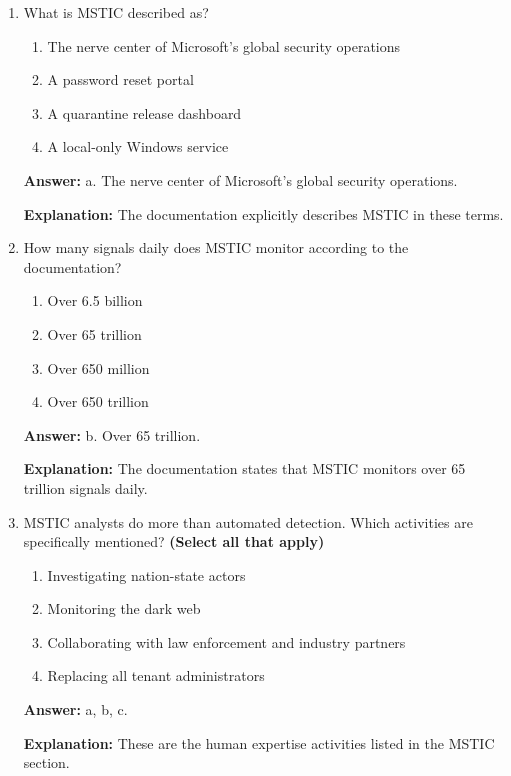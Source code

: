 \documentclass[10pt]{article}
\begin{document}
\begin{enumerate}[leftmargin=*]
\textbf{Explanation:} The documentation specifically identifies IT administrators and security professionals as the audience for these tools.

\item What is MSTIC described as?
\begin{enumerate}[label=\alph*., leftmargin=1.5em]
\item The nerve center of Microsoft’s global security operations
\item A password reset portal
\item A quarantine release dashboard
\item A local-only Windows service
\end{enumerate}
\textbf{Answer:} a. The nerve center of Microsoft’s global security operations.

\textbf{Explanation:} The documentation explicitly describes MSTIC in these terms.

\item How many signals daily does MSTIC monitor according to the documentation?
\begin{enumerate}[label=\alph*., leftmargin=1.5em]
\item Over 6.5 billion
\item Over 65 trillion
\item Over 650 million
\item Over 650 trillion
\end{enumerate}
\textbf{Answer:} b. Over 65 trillion.

\textbf{Explanation:} The documentation states that MSTIC monitors over 65 trillion signals daily.

\item MSTIC analysts do more than automated detection. Which activities are specifically mentioned? \textbf{(Select all that apply)}
\begin{enumerate}[label=\alph*., leftmargin=1.5em]
\item Investigating nation-state actors
\item Monitoring the dark web
\item Collaborating with law enforcement and industry partners
\item Replacing all tenant administrators
\end{enumerate}
\textbf{Answer:} a, b, c.

\textbf{Explanation:} These are the human expertise activities listed in the MSTIC section.


\end{enumerate}
\end{document}

